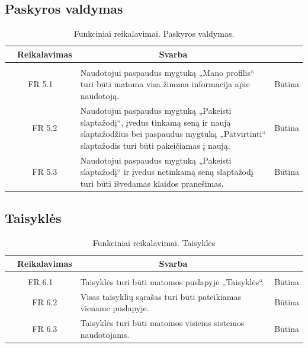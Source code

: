 \documentclass{VUMIFPSkursinis}
\begin{document}
	\subsection{Paskyros valdymas}
	
	\begin{table}[H]
		\caption{Funkciniai reikalavimai. Paskyros valdymas.}
		\begin{tabular}{|p{1cm}|p{1cm}|p{}|p{}|}
			\hline 
			\rowcolor{gray!50}
			\multicolumn{2}{|c|}{{\bfseries Kodas}}&
			\multicolumn{1}{c|}{{\bfseries Reikalavimas}}&
			\multicolumn{1}{c|}{{\bfseries Svarba}}\\
			\hline
			\rowcolor{lightgray}
			\multicolumn{4}{|c|}{Paskyros valdymas}\\				
			\hline
			\multicolumn{2}{|c|}{FR 5.1}&
			{Naudotojui paspaudus mygtuką „Mano profilis“ turi būti matoma visa žinoma informacija apie naudotoją.
			}&		
			\multicolumn{1}{c|}{Būtina}\\
			\hline
			\multicolumn{1}{|c}{}&
			\multicolumn{1}{c|}{FR 5.2}&
			{Naudotojui paspaudus mygtuką „Pakeisti slaptažodį“, įvedus tinkamą seną ir naują slaptažodžius bei paspaudus mygtuką „Patvirtinti“ slaptažodis turi būti pakeičiamas į naują.
			}&		
			\multicolumn{1}{c|}{Būtina}\\
			\hline
			\multicolumn{1}{|c}{}&
			\multicolumn{1}{c|}{FR 5.3}&
			{Naudotojui paspaudus mygtuką „Pakeisti slaptažodį“ ir įvedus netinkamą seną slaptažodį turi būti išvedamas klaidos pranešimas.
			}&
			\multicolumn{1}{c|}{Būtina}\\	
			\hline		
		\end{tabular}		
	\end{table}
	
	\subsection{Taisyklės}
	\begin{table}[H]
		\caption{Funkciniai reikalavimai. Taisyklės}
		\begin{tabular}{|p{1cm}|p{1cm}|p{}|p{}|}
			\hline 
			\rowcolor{gray!50}
			\multicolumn{2}{|c|}{{\bfseries Kodas}}&
			\multicolumn{1}{c|}{{\bfseries Reikalavimas}}&
			\multicolumn{1}{c|}{{\bfseries Svarba}}\\
			\hline
			\rowcolor{lightgray}
			\multicolumn{4}{|c|}{Taisyklės}\\		
			
			\hline
			\multicolumn{2}{|c|}{FR 6.1}&
			{Taisyklės turi būti matomos puslapyje „Taisyklės“.
			}&		
			\multicolumn{1}{c|}{Būtina}\\
			\hline
			\multicolumn{1}{|c}{}&
			\multicolumn{1}{c|}{FR 6.2}&
			{Visas taisyklių sąrašas turi būti pateikiamas viename puslapyje.
			}&		
			\multicolumn{1}{c|}{Būtina}\\
			\hline	
			\multicolumn{1}{|c}{}&
			\multicolumn{1}{c|}{FR 6.3}&
			{Taisyklės turi būti matomos visiems sistemos naudotojams.
			}&
			\multicolumn{1}{c|}{Būtina}\\									
			\hline
		\end{tabular}		
	\end{table}
	
\end{document}
